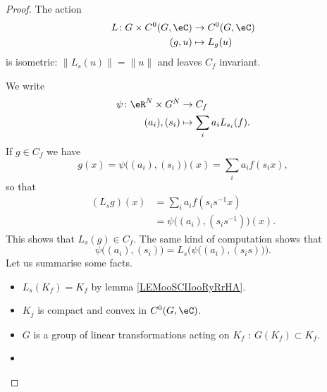 \begin{proof}
    The action
    \begin{equation}
        \begin{aligned}
            L\colon G\times C^0(G,\eC)&\to C^0(G,\eC) \\
            (g,u)&\mapsto L_g(u) 
        \end{aligned}
    \end{equation}
    is isometric: \( \| L_s(u) \|=\| u \|\) and leaves \( C_f\) invariant.
    \begin{subproof}
    \spitem[\( L_s(C_f)\subset C_f\)]
        We write
        \begin{equation}
            \begin{aligned}
                \psi\colon \eR^N\times G^N&\to C_f \\
                (a_i), (s_i)&\mapsto \sum_ia_iL_{s_i}(f). 
            \end{aligned}
        \end{equation}
        If \( g\in C_f\) we have
        \begin{equation}
                g(x)=\psi\big( (a_i), (s_i) \big)(x)=\sum_ia_if(s_ix),
        \end{equation}
        so that
        \begin{subequations}
            \begin{align}
                (L_sg)(x) &=\sum_ia_if(s_is^{-1}x)\\
                &=\psi\big( (a_i),(s_is^{-1}) \big)(x).
            \end{align}
        \end{subequations}
        This shows that \( L_s(g)\in C_f\).
    \spitem[\(C_f\subset L_s( C_f)\)]
        The same kind of computation shows that
        \begin{equation}
            \psi\big( (a_i),(s_i) \big)=L_s\Big( \psi\big( (a_i), (s_is) \big) \Big).
        \end{equation}
    \spitem[Kakutani]
        Let us summarise some facts.
        \begin{itemize}
            \item
                \( L_s(K_f)=K_f\) by lemma \ref{LEMooSCIIooRyRrHA}. 
            \item 
                \( K_j\) is compact and convex in \( C^0(G,\eC)\).
            \item
                \( G\) is a group of linear transformations acting on \( K_f\) : \( G(K_f)\subset K_f\).
            \item

\end{itemize}
\end{subproof}
\end{proof}
